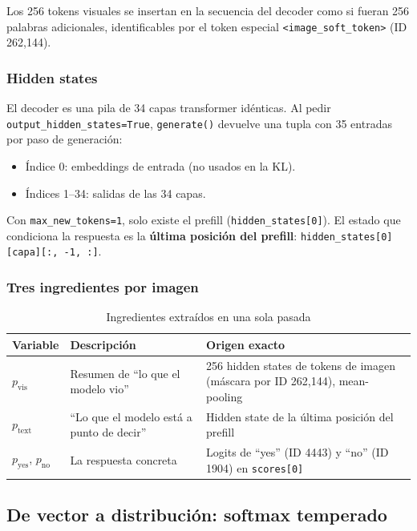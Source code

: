 \documentclass[12pt,a4paper]{article}
\begin{document}
Los 256 tokens visuales se insertan en la secuencia del decoder como si fueran 256 palabras adicionales, identificables por el token especial \texttt{<image\_soft\_token>} (ID 262,144).

\subsubsection{Hidden states}

El decoder es una pila de 34 capas transformer idénticas.
Al pedir \texttt{output\_hidden\_states=True}, \texttt{generate()} devuelve una tupla con 35 entradas por paso de generación:

\begin{itemize}
    \item Índice 0: embeddings de entrada (no usados en la KL).
    \item Índices 1--34: salidas de las 34 capas.
\end{itemize}

Con \texttt{max\_new\_tokens=1}, solo existe el prefill (\texttt{hidden\_states[0]}).
El estado que condiciona la respuesta es la \textbf{última posición del prefill}: \texttt{hidden\_states[0][capa][:, -1, :]}.

\subsubsection{Tres ingredientes por imagen}

\begin{table}[H]
\centering
\caption{Ingredientes extraídos en una sola pasada}
\label{tab:ingredientes}
\begin{tabularx}{\textwidth}{lXl}
\toprule
\textbf{Variable} & \textbf{Descripción} & \textbf{Origen exacto} \\
\midrule
$p_{\text{vis}}$ & Resumen de ``lo que el modelo vio'' & 256 hidden states de tokens de imagen (máscara por ID 262,144), mean-pooling \\
$p_{\text{text}}$ & ``Lo que el modelo está a punto de decir'' & Hidden state de la última posición del prefill \\
$p_{\text{yes}}$, $p_{\text{no}}$ & La respuesta concreta & Logits de ``yes'' (ID 4443) y ``no'' (ID 1904) en \texttt{scores[0]} \\
\bottomrule
\end{tabularx}
\end{table}

\subsection{De vector a distribución: softmax temperado}
\end{document}

